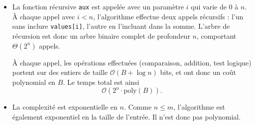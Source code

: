 \begin{exercice}
\begin{corrections}
\begin{itemize}
    \item La fonction récursive \texttt{aux} est appelée avec un paramètre $i$ qui
      varie de $0$ à $n$.
      À chaque appel avec $i < n$, l'algorithme effectue deux appels récursifs :
      l'un sans inclure \texttt{values[i]}, l'autre en l'incluant dans la somme.
      L'arbre de récursion est donc un arbre binaire complet de profondeur $n$,
      comportant $\Theta(2^n)$ appels.

      À chaque appel, les opérations effectuées (comparaison, addition, test logique)
      portent sur des entiers de taille $\mathcal{O}(B + \log n)$ bits, et ont donc
      un coût polynomial en $B$.
      Le temps total est ainsi
      $$
      \mathcal{O}(2^n \cdot \mathrm{poly}(B)).
      $$

    \item La complexité est exponentielle en $n$.
      Comme $n \le m$, l'algorithme est également exponentiel en la taille de l'entrée.
      Il n'est donc pas polynomial.
    \end{itemize}
  \end{corrections}

\end{exercice}

\endgroup
\endinput
